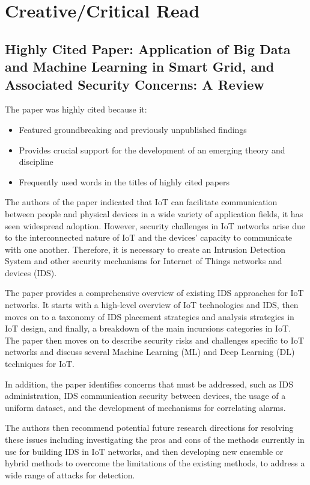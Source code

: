 \section{Creative/Critical Read}
\subsection{Highly Cited Paper: Application of Big Data and Machine Learning in Smart Grid, and Associated Security Concerns: A Review \cite{Hossain2019-dh} }
The paper was highly cited because it: 

\begin{itemize}
    \item Featured groundbreaking and previously unpublished findings  

    \item Provides crucial support for the development of an emerging theory and discipline 

    \item Frequently used words in the titles of highly cited papers 
\end{itemize}

The authors of the paper indicated that IoT can facilitate communication between people and physical devices in a wide variety of application fields, it has seen widespread adoption. However, security challenges in IoT networks arise due to the interconnected nature of IoT and the devices' capacity to communicate with one another. Therefore, it is necessary to create an Intrusion Detection System and other security mechanisms for Internet of Things networks and devices (IDS).  

The paper provides a comprehensive overview of existing IDS approaches for IoT networks. It starts with a high-level overview of IoT technologies and IDS, then moves on to a taxonomy of IDS placement strategies and analysis strategies in IoT design, and finally, a breakdown of the main incursions categories in IoT. The paper then moves on to describe security risks and challenges specific to IoT networks and discuss several Machine Learning (ML) and Deep Learning (DL) techniques for IoT.  

In addition, the paper identifies concerns that must be addressed, such as IDS administration, IDS communication security between devices, the usage of a uniform dataset, and the development of mechanisms for correlating alarms.  

The authors then recommend potential future research directions for resolving these issues including investigating the pros and cons of the methods currently in use for building IDS in IoT networks, and then developing new ensemble or hybrid methods to overcome the limitations of the existing methods, to address a wide range of attacks for detection. 

